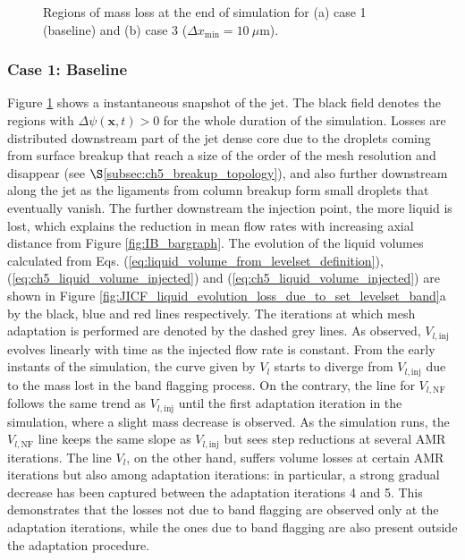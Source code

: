 \begin{figure}[h!]
	\centering
	\caption{Regions of mass loss at the end of simulation for (a) case 1 (baseline) and (b) case 3 ($\Delta x_\mathrm{min} = 10~\mu$m).}	\label{fig:jicf_mass_loss_baseline_and_dx10}
\end{figure}

\subsubsection*{Case 1: Baseline }

Figure \ref{fig:jicf_mass_loss_baseline_and_dx10} shows a instantaneous snapshot of the jet. The black field denotes the regions with $\Delta \psi \left( \textbf{x}, t \right) > 0$ for the whole duration of the simulation. Losses are distributed downstream part of the jet dense core due to the droplets coming from surface breakup that reach a size of the order of the mesh resolution and disappear (see $\S$\ref{subsec:ch5_breakup_topology}), and also further downstream along the jet as the ligaments from column breakup form small droplets that eventually vanish. The further downstream the injection point, the more liquid is lost, which explains the reduction in mean flow rates with increasing axial distance from Figure \ref{fig:IB_bargraph}. The evolution of the liquid volumes calculated from Eqs. (\ref{eq:liquid_volume_from_levelset_definition}), (\ref{eq:ch5_liquid_volume_injected}) and (\ref{eq:ch5_liquid_volume_injected}) are shown in Figure \ref{fig:JICF_liquid_evolution_loss_due_to_set_levelset_band}a by the black, blue and red lines respectively. The iterations at which mesh adaptation is performed are denoted by the dashed grey lines.  As observed, $V_{l,\mathrm{inj}}$ evolves linearly with time as the injected flow rate is constant. From the early instants of the simulation, the curve given by $V_l$ starts to diverge from $V_{l,\mathrm{inj}}$ due to the mass lost in the band flagging process. On the contrary, the line for $V_{l,\mathrm{NF}}$ follows the same trend as $V_{l,\mathrm{inj}}$ until the first adaptation iteration in the simulation, where a slight mass decrease is observed. As the simulation runs, the $V_{l,\mathrm{NF}}$ line keeps the same slope as $V_{l,\mathrm{inj}}$ but sees step reductions at several AMR iterations. The line $V_l$, on the other hand, suffers volume losses at certain AMR iterations but also among adaptation iterations: in particular, a strong gradual decrease has been captured between the adaptation iterations 4 and 5. This demonstrates that the losses not due to band flagging are observed only at the adaptation iterations, while the ones due to band flagging are also present outside the adaptation procedure. 

